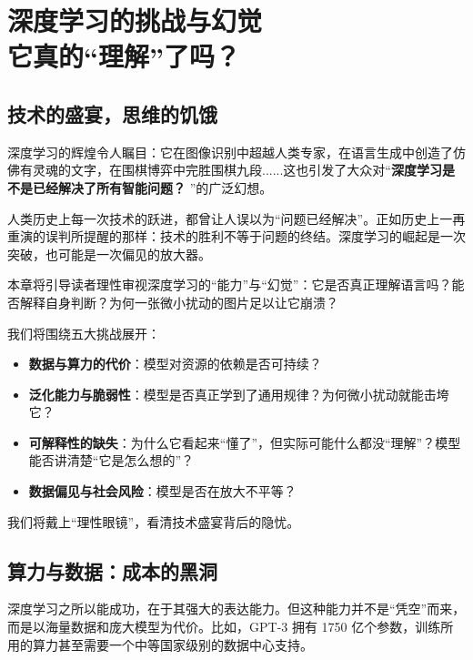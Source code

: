 \chapter{ 深度学习的挑战与幻觉\texorpdfstring{\\}{ } 它真的“理解”了吗？}

\section*{技术的盛宴，思维的饥饿}

深度学习的辉煌令人瞩目：它在图像识别中超越人类专家，在语言生成中创造了仿佛有灵魂的文字，在围棋博弈中完胜围棋九段......这也引发了大众对“\textbf{深度学习是不是已经解决了所有智能问题？} ”的广泛幻想。


人类历史上每一次技术的跃进，都曾让人误以为“问题已经解决”。正如历史上一再重演的误判所提醒的那样：技术的胜利不等于问题的终结。深度学习的崛起是一次突破，也可能是一次偏见的放大器。

本章将引导读者理性审视深度学习的“能力”与“幻觉”：它是否真正理解语言吗？能否解释自身判断？为何一张微小扰动的图片足以让它崩溃？

我们将围绕五大挑战展开：

\begin{itemize}
\item  \textbf{数据与算力的代价}：模型对资源的依赖是否可持续？
\item   \textbf{泛化能力与脆弱性}：模型是否真正学到了通用规律？为何微小扰动就能击垮它？ 
\item   \textbf{可解释性的缺失}：为什么它看起来“懂了”，但实际可能什么都没“理解”？模型能否讲清楚“它是怎么想的”？
\item  \textbf{数据偏见与社会风险}：模型是否在放大不平等？
\end{itemize}

我们将戴上“理性眼镜”，看清技术盛宴背后的隐忧。

\section*{算力与数据：成本的黑洞}
深度学习之所以能成功，在于其强大的表达能力。但这种能力并不是“凭空”而来，而是以海量数据和庞大模型为代价。比如，GPT-3 拥有 1750 亿个参数，训练所用的算力甚至需要一个中等国家级别的数据中心支持。

